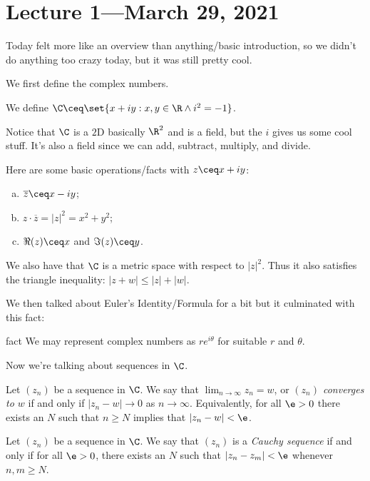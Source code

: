 \documentclass[class=article, crop=false]{standalone}
\begin{document}
\section{Lecture 1---March 29, 2021}

Today felt more like an overview than anything/basic introduction, so we didn't do anything too crazy today, but it was still pretty cool.

We first define the complex numbers.

\begin{defn}
  We define $\C\ceq \set{x+iy : x,y \in \R \land i^2 = -1}$.
\end{defn}
Notice that $\C$ is a $2$D basically $\R^2$ and is a field, but the $i$ gives us some cool stuff. It's also a field since we can add, subtract, multiply, and divide.

Here are some basic operations/facts with $z \ceq x+iy$:
  \begin{enumerate}[(a)]
    \item $\overline z \ceq x-iy$;
    \item $z\cdot \overline z=|z|^2=x^2+y^2$;
    \item $\Re(z) \ceq x$ and $\Im(z) \ceq y$.
  \end{enumerate}


We also have that $\C$ is a metric space with respect to $|z|^2$. Thus it also satisfies the triangle inequality: $|z+w| \leq |z|+|w|$.

We then talked about Euler's Identity/Formula for a bit but it culminated with this fact:
\begin{result}{fact}
  We may represent complex numbers as $r e^{i\theta}$ for suitable $r$ and $\theta$.
\end{result}

Now we're talking about sequences in $\C$.

\begin{defn}
  Let $(z_n)$ be a sequence in $\C$. We say that $\lim_{n \to \infty} z_n =w $, or \emph{$(z_n)$ converges to $w$} if and only if $|z_n-w| \to 0$ as $n \to \infty$. Equivalently, for all $\e > 0$ there exists an $N$ such that $n \geq N$ implies that $|z_n -w | < \e$.
\end{defn}

\begin{defn}
  Let $(z_n)$ be a sequence in $\C$. We say that $(z_n)$ is a \emph{Cauchy sequence} if and only if for all $\e > 0$, there exists an $N$ such that $|z_n-z_m| < \e$ whenever $n,m \geq N$.
\end{defn}
\end{document}
